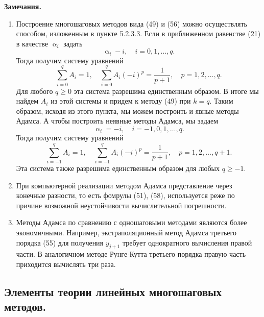 \documentclass[a4paper, 12pt]{report}
\renewcommand{\geq}{\geqslant}
\renewcommand{\alpha}{\upalpha}
\begin{document}
	 \textbf{Замечания.}
	 \begin{enumerate}
	 	\item Построение многошаговых методов вида (49) и (56) можно осуществлять способом, изложенным в пункте 5.2.3.3. Если в приближенном равенстве (21) в качестве $\alpha_i$ задать $$\alpha_i -i,\quad i = 0,1,\ldots, q.$$ Тогда получим систему уравнений $$\sum_{i=0}^{q}A_i = 1,\quad \sum_{i=0}^{q}A_i(-i)^p = \dfrac{1}{p+1},\quad p = 1,2,\ldots, q.$$
	 	Для любого $q \geq 0$ эта система разрешима единственным образом. В итоге мы найдем $A_i$ из этой системы и придем к методу (49) при $k=q$. Таким образом, исходя из этого пункта, мы можем построить и явные методы Адамса. А чтобы построить неявные методы Адамса, мы задаем $$\alpha_i = -i,\quad i = -1, 0, 1,\ldots, q.$$
	 	Тогда получим систему уравнений $$\sum_{i=-1}^{q}A_i = 1,\quad \sum_{i=-1}^{q}A_i(-i)^p = \dfrac{1}{p+1},\quad p = 1,2,\ldots, q+1.$$
	 	Эта система также разрешима единственным образом для любых $q \geq -1$.
	 	\item При компьютерной реализации методом Адамса представление через конечные разности, то есть фомрулы (51), (58), используется реже по причине возможной неустойчивости вычислительной погрешности.
	 	\item Методы Адамса по сравнению с одношаговыми методами являются более экономичными. Например, экстраполяционный метод Адамса третьего порядка (55) для получения $y_{j+1}$ требует однократного вычисления правой части. В аналогичном методе Рунге-Кутта третьего порядка правую часть приходится вычислять три раза.
	 \end{enumerate}
	 \subsection{Элементы теории линейных многошаговых методов.}
\end{document}
